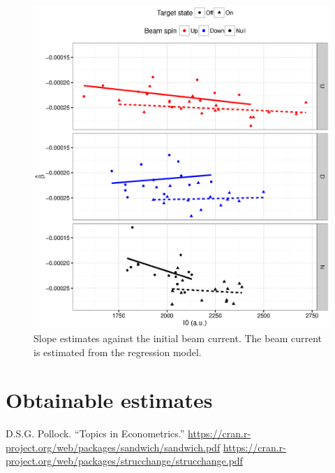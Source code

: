 \documentclass{article}
\begin{document}
\begin{figure}
	\centering
	\includegraphics{Slope_VS_IniCurrent_2016.eps}
	\caption{Slope estimates against the initial beam current. The beam current is estimated from the regression model.\label{fig:Slp_VS_I0}}
\end{figure}



\section{Obtainable estimates}

\begin{thebibliography}{9}
	D.S.G. Pollock. ``Topics in Econometrics.''
	\url{https://cran.r-project.org/web/packages/sandwich/sandwich.pdf}
	\url{https://cran.r-project.org/web/packages/strucchange/strucchange.pdf}
\end{thebibliography}
\end{document}
